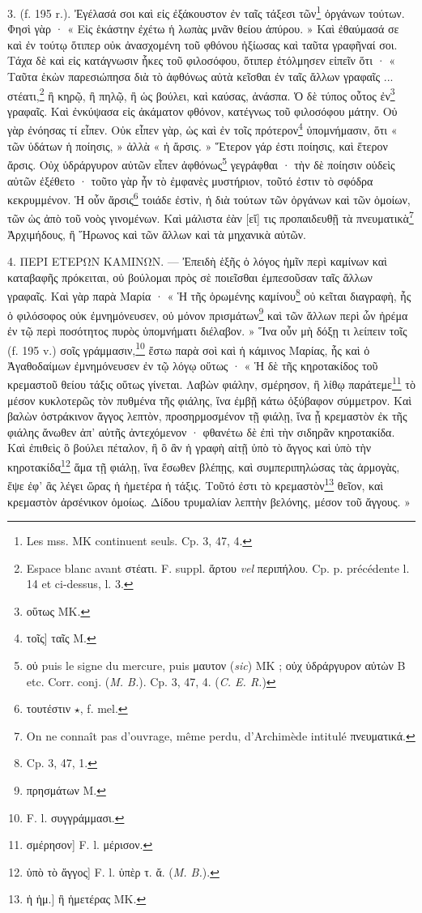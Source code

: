 \documentclass[landscape, a4paper, 11pt, oneside, polutonikogreek, french]{article}
\begin{document}
3. (f. 195 r.). Ἐγέλασά σοι καὶ εἰς ἐξάκουστον ἐν ταῖς τάξεσι τῶν\footnote{Les mss. MK continuent seuls. Cp. 3, 47, 4.} ὀργάνων τούτων. Φησὶ γὰρ · « Εἰς ἑκάστην ἐχέτω ἡ λωπὰς μνᾶν θείου ἀπύρου. » Καὶ ἐθαύμασά σε καὶ ἐν τούτῳ ὅτιπερ οὐκ ἀνασχομένη τοῦ φθόνου ἠξίωσας καὶ ταῦτα γραφῆναί σοι. Τάχα δὲ καὶ εἰς κατάγνωσιν ἧκες τοῦ φιλοσόφου, ὅτιπερ ἐτόλμησεν εἰπεῖν ὅτι · « Ταῦτα ἑκὼν παρεσιώπησα διὰ τὸ ἀφθόνως αὐτὰ κεῖσθαι ἐν ταῖς ἄλλων γραφαῖς ... στέατι,\footnote{Espace blanc avant στέατι. F. suppl. ἄρτου \emph{vel} περιπήλου. Cp. p. précédente l. 14 et ci-dessus, l. 3.} ἢ κηρῷ, ἢ πηλῷ, ἢ ὡς βούλει, καὶ καύσας, ἀνάσπα. Ὁ δὲ τύπος οὗτος ἐν\footnote{οὕτως MK.} γραφαῖς. Καὶ ἐνκύψασα εἰς ἀκάματον φθόνον, κατέγνως τοῦ φιλοσόφου μάτην. Οὐ γὰρ ἐνόησας τί εἶπεν. Οὐκ εἶπεν γὰρ, ὡς καὶ ἐν τοῖς πρότερον\footnote{τοῖς] ταῖς M.} ὐπομνήμασιν, ὅτι « τῶν ὑδάτων ἡ ποίησις, » ἀλλὰ « ἠ ἄρσις. » Ἕτερον γάρ ἐστι ποίησις, καὶ ἕτερον ἄρσις. Οὐχ ὑδράργυρον αὐτῶν εἶπεν ἀφθόνως\footnote{οὐ puis le signe du mercure, puis μαυτον (\emph{sic}) MK ; οὐχ ὑδράργυρον αὐτὼν B etc. Corr. conj. (\emph{M. B.}). Cp. 3, 47, 4. (\emph{C. E. R.})} γεγράφθαι · τὴν δὲ ποίησιν οὐδεὶς αὐτῶν ἐξέθετο · τοῦτο γὰρ ἦν τὸ ἐμφανὲς μυστήριον, τοῦτό ἐστιν τὸ σφόδρα κεκρυμμένον. Ἡ οὖν ἄρσις\footnote{τουτέστιν $\star$, f. mel.} τοιάδε ἐστὶν, ἡ διὰ τούτων τῶν ὀργάνων καὶ τῶν ὁμοίων, τῶν ὡς ἀπὸ τοῦ νοὸς γινομένων. Καὶ μάλιστα ἐὰν [εἴ] τις προπαιδευθῇ τὰ πνευματικὰ\footnote{On ne connaît pas d'ouvrage, même perdu, d'Archimède intitulé πνευματικά.} Ἀρχιμήδους, ἢ Ἥρωνος καὶ τῶν ἄλλων καὶ τὰ μηχανικὰ αὐτῶν.

4. ΠΕΡΙ ΕΤΕΡΩΝ ΚΑΜΙΝΩΝ. --- Ἐπειδὴ ἑξῆς ὁ λόγος ἡμῖν περὶ καμίνων καὶ καταβαφῆς πρόκειται, οὐ βούλομαι πρὸς σὲ ποιεῖσθαι ἐμπεσοῦσαν ταῖς ἄλλων γραφαῖς. Καὶ γὰρ παρὰ Μαρία · « Ἡ τῆς ὁρωμένης καμίνου\footnote{Cp. 3, 47, 1.} οὐ κεῖται διαγραφὴ, ἧς ὁ φιλόσοφος οὐκ ἐμνημόνευσεν, οὐ μόνον πρισμάτων\footnote{πρησμάτων M.} καὶ τῶν ἄλλων περὶ ὧν ἠρέμα ἐν τῷ περὶ ποσότητος πυρὸς ὑπομνήματι διέλαβον. » Ἵνα οὖν μὴ δόξῃ τι λείπειν τοῖς (f. 195 v.) σοῖς γράμμασιν,\footnote{F. l. συγγράμμασι.} ἔστω παρὰ σοὶ καὶ ἡ κάμινος Μαρίας, ἧς καὶ ὁ Ἀγαθοδαίμων ἐμνημόνευσεν ἐν τῷ λόγῳ οὕτως · « Ἡ δὲ τῆς κηροτακίδος τοῦ κρεμαστοῦ θείου τάξις οὕτως γίνεται. Λαβὼν φιάλην, σμέρησον, ἢ λίθῳ παράτεμε\footnote{σμέρησον] F. l. μέρισον.} τὸ μέσον κυκλοτερῶς τὸν πυθμένα τῆς φιάλης, ἵνα ἐμβῇ κάτω ὀξύβαφον σύμμετρον. Καὶ βαλὼν ὀστράκινον ἄγγος λεπτὸν, προσηρμοσμένον τῇ φιάλῃ, ἵνα ᾖ κρεμαστὸν ἐκ τῆς φιάλης ἄνωθεν ἀπ' αὐτῆς ἀντεχόμενον · φθανέτω δὲ ἐπὶ τὴν σιδηρᾶν κηροτακίδα. Καὶ ἐπιθεὶς ὃ βούλει πέταλον, ἢ ὃ ἂν ἡ γραφὴ αἰτῇ ὑπὸ τὸ ἄγγος καὶ ὑπὸ τὴν κηροτακίδα\footnote{ὑπὸ τὸ ἄγγος] F. l. ὑπὲρ τ. ἄ. (\emph{M. B.}).} ἅμα τῇ φιάλῃ, ἵνα ἔσωθεν βλέπῃς, καὶ συμπεριπηλώσας τὰς ἁρμογὰς, ἕψε ἐφ' ἃς λέγει ὥρας ἡ ἡμετέρα ἡ τάξις. Τοῦτό ἐστι τὸ κρεμαστὸν\footnote{ἡ ἡμ.] ἢ ἡμετέρας MK.} θεῖον, καὶ κρεμαστὸν ἀρσένικον ὁμοίως. Δίδου τρυμαλίαν λεπτὴν βελόνης, μέσον τοῦ ἄγγους. »
\end{document}
